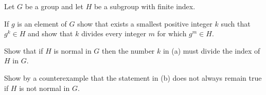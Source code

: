 Let $G$ be a group and let $H$ be a subgroup with finite index.
\begin{alist}
\item If $g$ is an element of $G$ show that exists a smallest
positive integer $k$ such that $g^k\in H$ and show that $k$ divides
every integer $m$ for which $g^m\in H$.
\item Show that if $H$ is normal in $G$ then the number $k$ in (a) must
divide the index of $H$ in $G$.
\item Show by a counterexample that the statement in (b) does not always
remain true if $H$ is not normal in $G$.
\end{alist}
